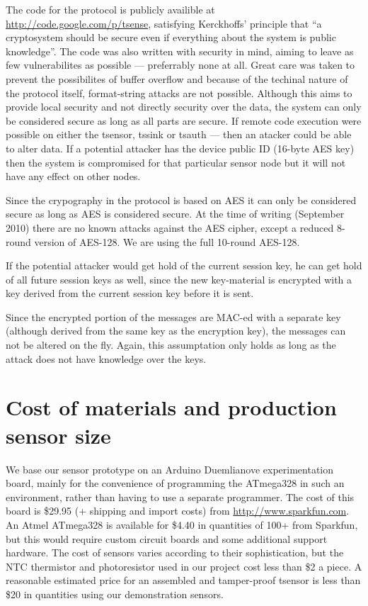 The code for the protocol is publicly availible at \url{http://code.google.com/p/tsense}, satisfying Kerckhoffs' principle that ``a cryptosystem should be secure even if everything about the system is public knowledge''. The code was also written with security in mind, aiming to leave as few vulnerabilites as possible --- preferrably none at all. Great care was taken to prevent the possibilites of buffer overflow and because of the techinal nature of the protocol itself, format-string attacks are not possible. Although this aims to provide local security and not directly security over the data, the system can only be considered secure as long as all parts are secure. If remote code execution were possible on either the tsensor, tssink or tsauth --- then an atacker could be able to alter data. If a potential attacker has the device public ID (16-byte AES key) then the system is compromised for that particular sensor node but it will not have any effect on other nodes.

Since the crypography in the protocol is based on AES it can only be considered secure as long as AES is considered secure. At the time of writing (September 2010) there are no known attacks against the AES cipher, except a reduced 8-round version of AES-128. We are using the full 10-round AES-128.

If the potential attacker would get hold of the current session key, he can get hold of all future session keys as well, since the new key-material is encrypted with a key derived from the current session key before it is sent. 

Since the encrypted portion of the messages are MAC-ed with a separate key (although derived from the same key as the encryption key), the messages can not be altered on the fly. Again, this assumptation only holds as long as the attack does not have knowledge over the keys. 


\section{Cost of materials and production sensor size}

We base our sensor prototype on an Arduino Duemlianove experimentation board, mainly for the convenience of programming the ATmega328 in such an environment, rather than having to use a separate programmer. The cost of this board is \$29.95 (+ shipping and import costs) from \url{http://www.sparkfun.com}. An Atmel ATmega328 is available for \$4.40 in quantities of 100+ from Sparkfun, but this would require custom circuit boards and some additional support hardware. The cost of sensors varies according to their sophistication, but the NTC thermistor and photoresistor used in our project cost less than \$2 a piece. A reasonable estimated price for an assembled and tamper-proof tsensor is less than \$20 in quantities using our demonstration sensors. 

